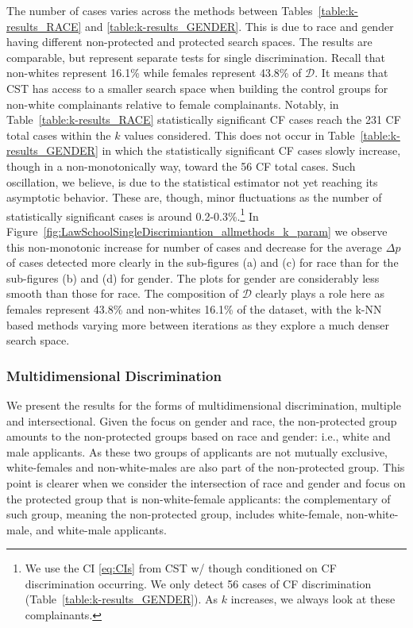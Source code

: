 The number of cases varies across the methods between Tables~\ref{table:k-results_RACE} and \ref{table:k-results_GENDER}. 
This is due to race and gender having different non-protected and protected search spaces.
The results are comparable, but represent separate tests for single discrimination.
Recall that non-whites represent 16.1\% while females represent 43.8\% of $\mathcal{D}$. 
It means that CST has access to a smaller search space when building the control groups for non-white complainants relative to female complainants.
Notably, in Table~\ref{table:k-results_RACE} statistically significant CF cases reach the 231 CF total cases within the $k$ values considered. 
This does not occur in Table~\ref{table:k-results_GENDER} in which the statistically significant CF cases slowly increase, though in a non-monotonically way, toward the 56 CF total cases.
Such oscillation, we believe, is due to the statistical estimator not yet reaching its asymptotic behavior.
These are, though, minor fluctuations as the number of statistically significant cases is around 0.2-0.3\%.\footnote{We use the CI \eqref{eq:CIs} from CST w/ though conditioned on CF discrimination occurring. We only detect 56 cases of CF discrimination (Table~\ref{table:k-results_GENDER}). As $k$ increases, we always look at these complainants.}
In Figure~\ref{fig:LawSchoolSingleDiscrimiantion_allmethods_k_param} we observe this non-monotonic increase for number of cases and decrease for the average $\Delta p$ of cases detected more clearly in the sub-figures (a) and (c) for race than for the sub-figures (b) and (d) for gender. 
The plots for gender are considerably less smooth than those for race. 
The composition of $\mathcal{D}$ clearly plays a role here as females represent 43.8\% and non-whites 16.1\% of the dataset, with the k-NN based methods varying more between iterations as they explore a much denser search space.

\subsubsection{Multidimensional Discrimination}
\label{sec:Experiments.Real.Multi}

We present the results for the forms of multidimensional discrimination, multiple and intersectional.
Given the focus on gender and race, the non-protected group amounts to the non-protected groups based on race and gender: i.e., white and male applicants.
As these two groups of applicants are not mutually exclusive, white-females and non-white-males are also part of the non-protected group.
This point is clearer when we consider the intersection of race and gender and focus on the protected group that is non-white-female applicants: the complementary of such group, meaning the non-protected group, includes white-female, non-white-male, and white-male applicants.

